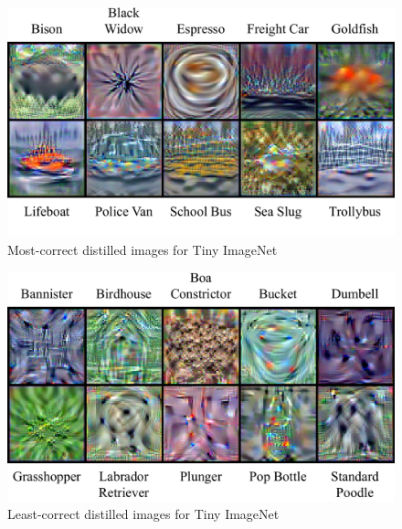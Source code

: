 \documentclass[main.tex]{subfiles}
\begin{document}
\begin{figure}
    \centering
    \includegraphics[width=\linewidth]{figures/Tiny_Good.pdf}
    \vspace{-20pt}
    \caption{Most-correct distilled images for Tiny ImageNet }
    \label{fig:tinygood}
    \vspace{-8pt}
\end{figure}
\begin{figure}
    \centering
    \includegraphics[width=\linewidth]{figures/Tiny_Bad.pdf}
    \vspace{-8pt}
    \caption{Least-correct distilled images for Tiny ImageNet }
    \label{fig:tinybad}
    \vspace{-8pt}
\end{figure}


\clearpage
\end{document}
